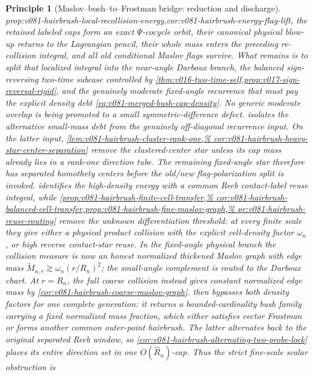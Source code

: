 \documentclass[10pt]{article}
\newtheorem{principle}[theorem]{Principle}
\begin{document}
\begin{principle}[Maslov--bush--to--Frostman bridge: reduction and discharge]
{prop:v081-hairbrush-local-recollision-energy,cor:v081-hairbrush-energy-flag-lift}, the retained
labeled caps form an exact \(\Psi\)-cocycle orbit, their canonical physical blow-up returns to the
Lagrangian pencil, their whole mass enters the preceding re-collision integral, and all old
conditional Maslov flags survive.  What remains is to split that localized integral
into the near-angle Darboux branch, the balanced sign-reversing two-time subcase controlled by
\cref{thm:v016-two-time-self,prop:v017-sign-reversal-rigid}, and the genuinely moderate
fixed-angle recurrence that must pay the explicit density debt
\eqref{eq:v081-merged-bush-cap-density}.  No generic moderate overlap is being promoted to a
small symmetric-difference defect.   isolates the alternative small-mass debt
from the genuinely off-diagonal recurrence input.  On the latter input,
\cref{lem:v081-hairbrush-cluster-rank-one,%
cor:v081-hairbrush-heavy-star-center-separation} remove the clustered-center star unless its cap
mass already lies in a rank-one direction tube.  The remaining fixed-angle star therefore has
separated homothety centers before the old/new flag-polarization split is invoked.   identifies the high-density energy with a common Reeb
contact-label reuse integral, while
\cref{prop:v081-hairbrush-finite-cell-transfer,%
cor:v081-hairbrush-balanced-cell-transfer,prop:v081-hairbrush-fine-maslov-graph,%
pr:v081-hairbrush-reuse-routing} remove the unknown
differentiation threshold: at every finite scale they give either a physical product collision with
the explicit cell-density factor \(\omega_n\), or high reverse contact-star reuse.  In the
fixed-angle physical branch the collision measure is now an honest normalized thickened Maslov
graph with edge mass
\(\widetilde M_{n,r}\gtrsim\omega_n(r/R_n)^2\); the small-angle complement is routed to the
Darboux chart.  At \(r=R_n\), the full coarse collision instead gives constant normalized edge
mass by \cref{cor:v081-hairbrush-coarse-maslov-graph}.   then bypasses both density factors for one
complete generation: it returns a bounded-cardinality bush family carrying a fixed normalized
mass fraction, which either satisfies vector Frostman or forms another common outer-point
hairbrush.  The latter alternates back to the original separated Reeb window, so
\cref{cor:v081-hairbrush-alternating-two-probe-lock} places its entire direction set in one
\(O(\widehat R_n)\)-cap.  Thus the strict fine-scale scalar obstruction is

\end{principle}
\end{document}
